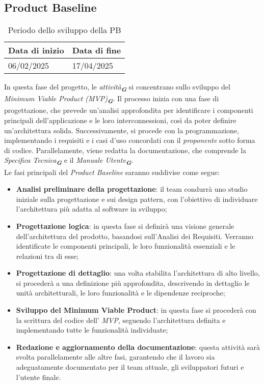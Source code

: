 \subsection{Product Baseline}
\label{sec:product baseline}
\begin{table}[h!]
    \centering
    \renewcommand{\arraystretch}{1.5} %
    \begin{tabularx}{\textwidth}{|X|X|}\hline
    \rowcolor[HTML]{FFD700} 
    \textbf{Data di inizio} & \textbf{Data di fine} \\ \hline
    06/02/2025 & 17/04/2025 \\ \hline
    \end{tabularx}
    \caption{Periodo dello sviluppo della PB}
\end{table}
In questa fase del progetto, le {\emph{attività}}\textsubscript{\textit{\textbf{G}}} si concentrano sullo sviluppo del {\emph{Minimum Viable Product (MVP)}}\textsubscript{\textit{\textbf{G}}}. 
Il processo inizia con una fase di progettazione, che prevede un’analisi approfondita per identificare i componenti principali dell’applicazione e le loro interconnessioni, così da poter definire un’architettura solida. 
Successivamente, si procede con la programmazione, implementando i requisiti e i casi d’uso concordati con il \emph{proponente} sotto forma di codice. 
Parallelamente, viene redatta la documentazione, che comprende la {\emph{Specifica Tecnica}}\textsubscript{\textit{\textbf{G}}} e il {\emph{Manuale Utente}}\textsubscript{\textit{\textbf{G}}}.\\
Le fasi principali del \emph{Product Baseline} saranno suddivise come segue:
\begin{itemize}
\item \textbf{Analisi preliminare della progettazione}: il team condurrà uno studio iniziale sulla progettazione e sui design pattern, con l’obiettivo di individuare l’architettura più adatta al software in sviluppo;
\item \textbf{Progettazione logica}: in questa fase si definirà una visione generale dell’architettura del prodotto, basandosi sull’Analisi dei Requisiti. Verranno identificate le componenti principali, le loro funzionalità essenziali e le relazioni tra di esse;
\item \textbf{Progettazione di dettaglio}: una volta stabilita l’architettura di alto livello, si procederà a una definizione più approfondita, descrivendo in dettaglio le unità architetturali, le loro funzionalità e le dipendenze reciproche;
\item \textbf{Sviluppo del Minimum Viable Product}: in questa fase si procederà con la scrittura del codice dell’ \emph{MVP}, seguendo l’architettura definita e implementando tutte le funzionalità individuate;
\item \textbf{Redazione e aggiornamento della documentazione}: questa attività sarà svolta parallelamente alle altre fasi, garantendo che il lavoro sia adeguatamente documentato per il team attuale, gli sviluppatori futuri e l’utente finale.
\end{itemize}

